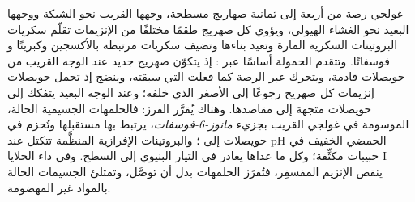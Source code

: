 \begin{proposition}\label{prop:b3:membrane-traffic:golgi}
غولجي رصة من أربعة إلى ثمانية صهاريج مسطحة، وجهها القريب
نحو الشبكة ووجهها البعيد نحو الغشاء الهيولي، ويؤوي كل
صهريج طقمًا مختلفًا من الإنزيمات تقلّم سكريات البروتينات
السكرية المارة وتعيد بناءها وتضيف سكريات مرتبطة بالأكسجين وكبريتًا و
فوسفاتًا. وتتقدم الحمولة أساسًا عبر \emph{}: إذ يتكوّن
صهريج جديد عند الوجه القريب من حويصلات قادمة، ويتحرك عبر
الرصة كما فعلت التي سبقته، وينضج إذ تحمل حويصلات 
إنزيمات كل صهريج رجوعًا إلى الأصغر الذي خلفه؛ وعند
الوجه البعيد يتفكك إلى حويصلات متجهة إلى مقاصدها.
وهناك يُقرَّر الفرز: فالحلمهات الجسيمية الحالة، الموسومة في غولجي
القريب بجزيء \emph{مانوز-6-فوسفات}، يرتبط بها مستقبلها وتُحزم
في حويصلات  إلى ؛ والبروتينات الإفرازية المنظَّمة
تتكتل عند pH الحمضي الخفيف في حبيبات مكثِّفة؛
وكل ما عداها يغادر في التيار البنيوي إلى السطح. وفي
داء الخلايا I ينقص الإنزيم المفسفِر، فتُفرَز الحلمهات
بدل أن توصَّل، وتمتلئ الجسيمات الحالة بالمواد
غير المهضومة.
\end{proposition}

